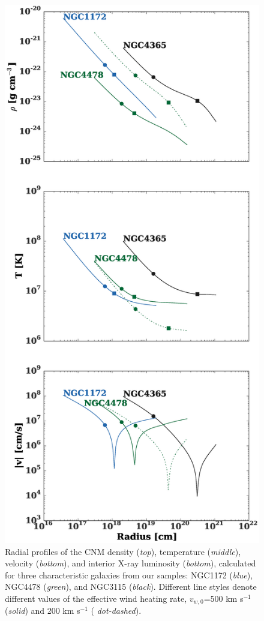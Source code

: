 \documentclass[usenatbib,fleqn]{mn2e}
\begin{document}
\begin{figure}
  \includegraphics[width=\columnwidth]{profiles.eps}
  \caption{\label{fig:profiles}Radial profiles of the CNM density
    ({\it top}), temperature ({\it middle}), velocity  ({\it bottom}), and
    interior X-ray luminosity ({\it bottom}), calculated for three
    characteristic galaxies from our samples: NGC1172 ({\it blue}),
    NGC4478 ({\it green}), and NGC3115 ({\it black}).  Different line
    styles denote different values of the effective wind heating rate,
    $v_{w,0}$=500 km s$^{-1}$ ({\it solid}) and 200 km s$^{-1}$ ({\it
     dot-dashed}).}
\end{figure}
\end{document}
